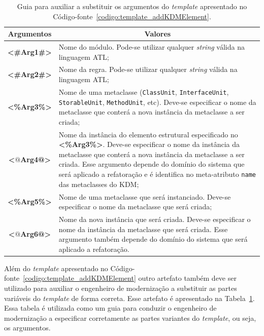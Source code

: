 \begin{table}
\centering
\caption{Guia para auxiliar a substituir os argumentos do \textit{template} apresentado no Código-fonte~\ref{codigo:template_addKDMElement}.}
\label{tab:guia_template_operacao_add}
\begin{tabular}{ | m{1.7cm} | m{12cm}| } 
\hline
\multicolumn{1}{|c|}{Argumentos}                                         & \multicolumn{1}{c|}{Valores} \\ \hline
\multicolumn{1}{|c|}{\textbf{<\#Arg1\#>}} & Nome do módulo. Pode-se utilizar qualquer \textit{string} válida na linguagem ATL; \\ 
\hline
\multicolumn{1}{|c|}{\textbf{<\#Arg2\#>}} & Nome da regra. Pode-se utilizar qualquer \textit{string} válida na linguagem ATL; \\  
\hline
\multicolumn{1}{|c|}{\textbf{<\%Arg3\%>}} & Nome de uma metaclasse (\texttt{ClassUnit}, \texttt{InterfaceUnit}, \texttt{StorableUnit}, \texttt{MethodUnit}, etc). Deve-se especificar o nome da metaclasse que conterá a nova instância da metaclasse a ser criada; \\ 
\hline
\multicolumn{1}{|c|}{\textbf{<$@$Arg4@>}} & Nome da instância do elemento estrutural especificado no \textbf{<\%Arg3\%>}. Deve-se especificar o nome da instância da metaclasse que conterá a nova instância da metaclasse a ser criada. Esse argumento depende do domínio do sistema que será aplicado a refatoração e é identifica no meta-atributo \texttt{name} das metaclasses do KDM;  \\ 
\hline
\multicolumn{1}{|c|}{\textbf{<\%Arg5\%>}} & Nome de uma metaclasse que será instanciado. Deve-se especificar o nome da metaclasse que será criada;  \\ 
\hline
\multicolumn{1}{|c|}{\textbf{<$@$Arg6@>}} & Nome da nova instância que será criada. Deve-se especificar o nome da instância da metaclasse que será criada. Esse argumento também depende do domínio do sistema que será aplicado a refatoração.  \\ 
\hline
\end{tabular}
\end{table}

Além do \textit{template} apresentado no Código-fonte~\ref{codigo:template_addKDMElement} outro artefato também deve ser utilizado para auxiliar o engenheiro de modernização a substituir as partes variáveis do \textit{template} de forma correta. Esse artefato é apresentado na Tabela~\ref{tab:guia_template_operacao_add}. Essa tabela é utilizada como um guia para conduzir o engenheiro de modernização a especificar corretamente as partes variantes do \textit{template}, ou seja, os argumentos.

